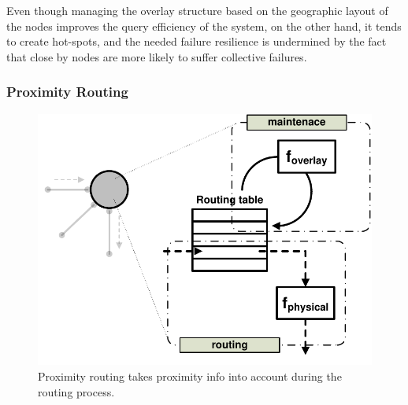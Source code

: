 Even though managing the overlay structure based on the geographic layout of the
nodes improves the query efficiency of the system, on the other hand, it tends
to create hot-spots, and the needed failure resilience is undermined by the fact
that close by nodes are more likely to suffer collective failures.


%
%
%

\subsubsection{Proximity Routing}

\begin{figure}[ht]
\centering
  \includegraphics[scale=0.4]{img/pdf/proximity-routing.pdf}
\caption{Proximity routing takes proximity info into account during the
routing process.}
\label{figure:proximity-routing}
\end{figure}

